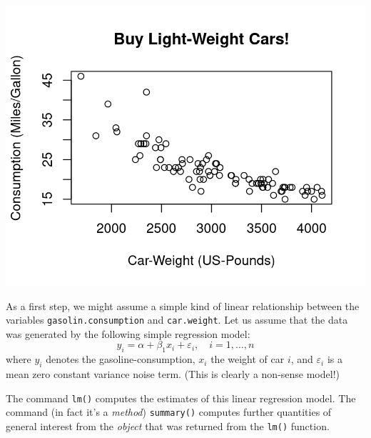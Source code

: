 \documentclass[
  14pt,
]{memoir}
\begin{document}
\begin{center}\includegraphics[width=0.8\linewidth]{figure/minimal-fig-margin-1} \end{center}

\hfill\break

As a first step, we might assume a simple kind of linear relationship between the variables \texttt{gasolin.consumption} and \texttt{car.weight}. Let us assume that the data was generated by the following simple regression model:
\[
y_i=\alpha+\beta_1 x_i+\varepsilon_i,\quad i=1,\dots,n
\]
where \(y_i\) denotes the gasoline-consumption, \(x_i\) the weight of car \(i\), and \(\varepsilon_i\) is a mean zero constant variance noise term. (This is clearly a non-sense model!)

The command \texttt{lm()} computes the estimates of this linear regression model. The command (in fact it's a \emph{method}) \texttt{summary()} computes further quantities of general interest from the \emph{object} that was returned from the \texttt{lm()} function.
\end{document}
